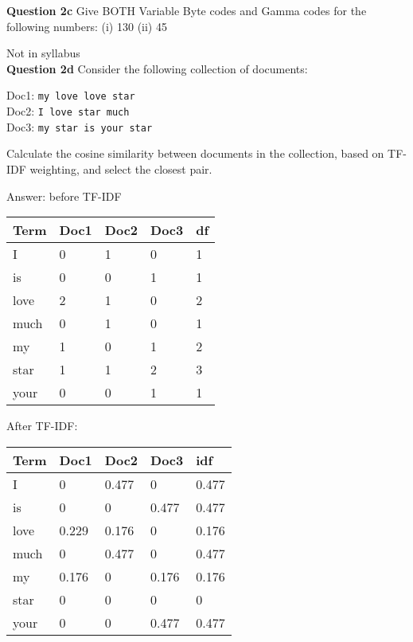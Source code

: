 \documentclass[11pt,a4paper]{report}
\begin{document}
\begin{multicols*}{2}
\noindent \textbf{Question 2c} Give BOTH Variable Byte codes and Gamma codes for the following numbers: (i) 130 (ii) 45

\noindent Not in syllabus\\

\noindent \textbf{Question 2d} Consider the following collection of documents:
\begin{center}
Doc1: \verb|my love love star|\\
Doc2: \verb|I love star much|\\
Doc3: \verb|my star is your star|
\end{center}

\noindent Calculate the cosine similarity between documents in the collection, based on TF-IDF weighting, and select the closest pair.

\noindent Answer: before TF-IDF
\begin{center}
\begin{tabular}{ | l | l l l |l|} 
    \hline
    Term   & Doc1 & Doc2 & Doc3 & df \\
    \hline
    I      & 0    & 1    & 0    & 1  \\
    is     & 0    & 0    & 1    & 1  \\
    love   & 2    & 1    & 0    & 2  \\
    much   & 0    & 1    & 0    & 1  \\
    my     & 1    & 0    & 1    & 2  \\
    star   & 1    & 1    & 2    & 3  \\
    your   & 0    & 0    & 1    & 1  \\
    \hline
\end{tabular}
\end{center}

\noindent After TF-IDF:
\begin{center}
\begin{tabular}{ | l | l l l |l|} 
    \hline
    Term   & Doc1 & Doc2 & Doc3 & idf   \\
    \hline
    I      &0     &0.477 &0     & 0.477 \\
    is     &0     &0     &0.477 & 0.477 \\
    love   &0.229 &0.176 &0     & 0.176 \\
    much   &0     &0.477 &0     & 0.477 \\
    my     &0.176 &0     &0.176 & 0.176 \\
    star   &0     &0     &0     & 0     \\
    your   &0     &0     &0.477 & 0.477 \\
    \hline
\end{tabular}
\end{center}


\end{multicols*}
\end{document}
